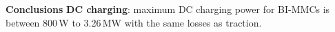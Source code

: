 \documentclass[20pt,t]{beamer}
\begin{document}
\begin{frame}
\begin{columns}[c]
\begin{column}{.49\textwidth}
\begin{block}{\vspace{2mm} \Large\bfseries Conclusions \vspace{1mm}}
					\textbf{DC charging}: maximum DC charging power for BI-MMCs is between 800\,W to 3.26\,MW with the same losses as traction.
				\end{block}
%					
%					
%					
			\end{column}
		\end{columns}
	\end{frame}
\end{document}
